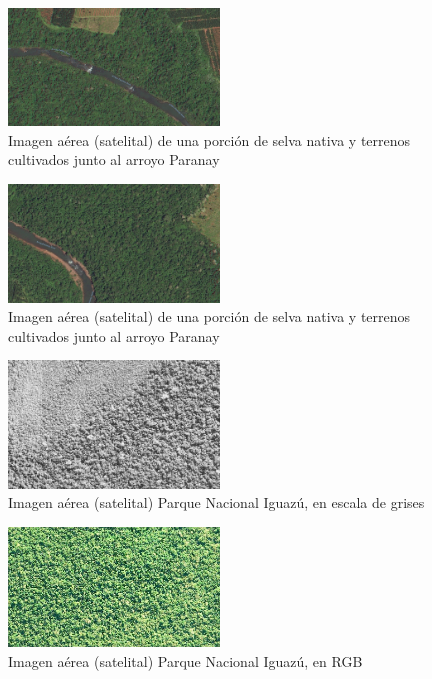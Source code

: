 
\begin{figure}[h!]
    \includegraphics[width=0.5\textwidth]{Imagenes/Homomorfico/Paranai1.jpg}
     \hfill
     \caption{Imagen aérea (satelital) de una porción de selva nativa y terrenos cultivados junto al arroyo Paranay }
\end{figure}

\begin{figure}[h!]
    \includegraphics[width=0.5\textwidth]{Imagenes/Homomorfico/Paranai2.jpg}
     \hfill
     \caption{Imagen aérea (satelital) de una porción de selva nativa y terrenos cultivados junto al arroyo Paranay}
\end{figure}

\begin{figure}[h!]
    \includegraphics[width=0.5\textwidth]{Imagenes/Homomorfico/PNI1gris.jpg}
     \hfill
     \caption{Imagen aérea (satelital) Parque Nacional Iguazú, en escala de grises}
\end{figure}

\begin{figure}[h!]
    \includegraphics[width=0.5\textwidth]{Imagenes/Homomorfico/PNI2_original.jpg}
     \hfill
     \caption{Imagen aérea (satelital) Parque Nacional Iguazú, en RGB}
\end{figure}

